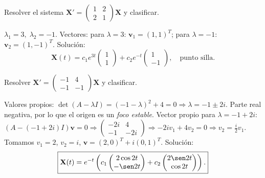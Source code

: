 \begin{prob}
Resolver el sistema $\mathbf{X}'=
\begin{pmatrix}
1&2\\
2&1
\end{pmatrix}\mathbf{X}$ y clasificar.
\begin{myproof}
$\lambda_1=3,\; \lambda_2=-1$. Vectores: para $\lambda=3$: $\mathbf{v}_1=(1,1)^T$; para $\lambda=-1$: $\mathbf{v}_2=(1,-1)^T$.
Solución:
\[
\boxed{
\mathbf{X}(t)=c_1 e^{3t}
\begin{pmatrix}
1\\1
\end{pmatrix}
+c_2 e^{-t}
\begin{pmatrix}
1\\-1
\end{pmatrix},\quad \text{punto silla.}
}
\]
\end{myproof}
\end{prob}

\begin{prob}
Resolver $\mathbf{X}'=
\begin{pmatrix}
-1&4\\
-1&-1
\end{pmatrix}\mathbf{X}$
y clasificar.
\begin{myproof}
Valores propios: $\det(A-\lambda I)=(-1-\lambda)^2+4=0\Rightarrow \lambda=-1\pm2i$. Parte real negativa, por lo que el origen es un \emph{foco estable}. Vector propio para $\lambda=-1+2i$: $(A-(-1+2i)I)\mathbf{v}=0\Rightarrow
\begin{pmatrix}
-2i&4\\
-1&-2i
\end{pmatrix}\Rightarrow -2i v_1+4v_2=0\Rightarrow v_2=\frac{i}{2}v_1$. Tomamos $v_1=2$, $v_2=i$, $\mathbf{v}=(2,0)^T+i(0,1)^T$.
Solución:
\[
\boxed{
\mathbf{X}(t)=e^{-t}\left(c_1
\begin{pmatrix}
2\cos 2t\\
-\sen 2t
\end{pmatrix}
+c_2
\begin{pmatrix}
2\sen 2t\\
\cos 2t
\end{pmatrix}\right).
}
\]
\end{myproof}
\end{prob}

